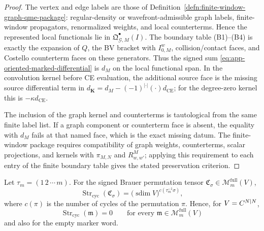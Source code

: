 \begin{proof}
  The vertex and edge labels are those of
  Definition~\ref{defn:finite-window-graph-qme-package}: regular-density
  or wavefront-admissible graph labels, finite-window propagators,
  renormalized weights, and local counterterms.  Hence the represented
  local functionals lie in
  \(\mathfrak Q^\bullet_{\mathcal G,M}(I)\).  The boundary table
  (B1)--(B4) is exactly the expansion of \(Q\), the BV bracket with
  \(I^w_{0,M}\), collision/contact faces, and Costello counterterm faces on
  these generators.  Thus the signed sum
  \eqref{eq:app-oriented-marked-differential} is \(d_M\) on the local
  functional span.  In the convolution kernel before CE evaluation, the
  additional source face is the missing source differential term in
  \(d_{\mathbf K}=d_M-(-1)^{|\cdot|}(\cdot)d_{\mathrm{CE}}\); for the
  degree-zero kernel this is \(-\kappa d_{\mathrm{CE}}\).

  The inclusion of the graph kernel and counterterms is tautological from
  the same finite label list.  If a graph component or counterterm face is
  absent, the equality with \(d_M\) fails at that named face, which is the
  exact missing datum.  The finite-window package requires compatibility of
  graph weights, counterterms, scalar projections, and kernels with
  \(\pi_{M,N}\) and \(R^M_{w,w'}\); applying this requirement to each entry
  of the finite boundary table gives the stated preservation criterion.
\end{proof}

\begin{lem}
\label{lem:app-full-equivariant-cyclic-supertrace}
  Let \(\tau_m=(1\,2\,\cdots\,m)\).  For the signed Brauer permutation
  tensor \(\mathfrak C_\sigma\in\mathcal M_m^{\mathrm{full}}(V)\),
  \[
    \operatorname{Str}_{\mathrm{cyc}}(\mathfrak C_\sigma)
      =
    \bigl(\operatorname{sdim}V\bigr)^{c(\tau_m^{-1}\sigma)},
    \label{eq:app-strcyc-brauer-permutation}
  \]
  where \(c(\pi)\) is the number of cycles of the permutation \(\pi\).
  Hence, for \(V=C^{N|N}\),
  \[
    \operatorname{Str}_{\mathrm{cyc}}(\mathfrak m)=0
    \qquad
    \text{for every }
    \mathfrak m\in\mathcal M_m^{\mathrm{full}}(V)
  \]
  and also for the empty marker word.
\end{lem}

